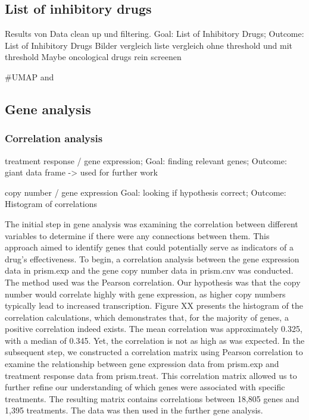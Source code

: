 \documentclass[
  11pt,
]{article}
\begin{document}
\hypertarget{list-of-inhibitory-drugs}{%
\subsection{List of inhibitory drugs}\label{list-of-inhibitory-drugs}}

Results von Data clean up und filtering. Goal: List of Inhibitory Drugs;
Outcome: List of Inhibitory Drugs Bilder vergleich liste vergleich ohne
threshold und mit threshold Maybe oncological drugs rein screenen

\#UMAP and

\hypertarget{gene-analysis}{%
\subsection{Gene analysis}\label{gene-analysis}}

\hypertarget{correlation-analysis}{%
\subsubsection{Correlation analysis}\label{correlation-analysis}}

treatment response / gene expression; Goal: finding relevant genes;
Outcome: giant data frame -\textgreater{} used for further work

copy number / gene expression Goal: looking if hypothesis correct;
Outcome: Histogram of correlations

The initial step in gene analysis was examining the correlation between
different variables to determine if there were any connections between
them. This approach aimed to identify genes that could potentially serve
as indicators of a drug's effectiveness. To begin, a correlation
analysis between the gene expression data in prism.exp and the gene copy
number data in prism.cnv was conducted. The method used was the Pearson
correlation. Our hypothesis was that the copy number would correlate
highly with gene expression, as higher copy numbers typically lead to
increased transcription. Figure XX presents the histogram of the
correlation calculations, which demonstrates that, for the majority of
genes, a positive correlation indeed exists. The mean correlation was
approximately 0.325, with a median of 0.345. Yet, the correlation is not
as high as was expected. In the subsequent step, we constructed a
correlation matrix using Pearson correlation to examine the relationship
between gene expression data from prism.exp and treatment response data
from prism.treat. This correlation matrix allowed us to further refine
our understanding of which genes were associated with specific
treatments. The resulting matrix contains correlations between 18,805
genes and 1,395 treatments. The data was then used in the further gene
analysis.
\end{document}
